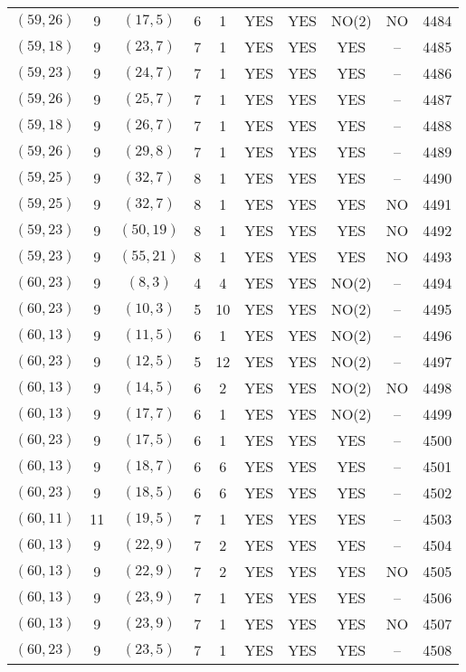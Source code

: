 \begin{longtable}{|c|c|c|c|c|c|c|c|c|c|}
$(59, 26)$ & 9 & $(17, 5)$ & 6 & 1 & YES & YES & NO(2) & NO & 4484\\
$(59, 18)$ & 9 & $(23, 7)$ & 7 & 1 & YES & YES & YES & -- & 4485\\
$(59, 23)$ & 9 & $(24, 7)$ & 7 & 1 & YES & YES & YES & -- & 4486\\
$(59, 26)$ & 9 & $(25, 7)$ & 7 & 1 & YES & YES & YES & -- & 4487\\
$(59, 18)$ & 9 & $(26, 7)$ & 7 & 1 & YES & YES & YES & -- & 4488\\
$(59, 26)$ & 9 & $(29, 8)$ & 7 & 1 & YES & YES & YES & -- & 4489\\
$(59, 25)$ & 9 & $(32, 7)$ & 8 & 1 & YES & YES & YES & -- & 4490\\
$(59, 25)$ & 9 & $(32, 7)$ & 8 & 1 & YES & YES & YES & NO & 4491\\
$(59, 23)$ & 9 & $(50, 19)$ & 8 & 1 & YES & YES & YES & NO & 4492\\
$(59, 23)$ & 9 & $(55, 21)$ & 8 & 1 & YES & YES & YES & NO & 4493\\
$(60, 23)$ & 9 & $(8, 3)$ & 4 & 4 & YES & YES & NO(2) & -- & 4494\\
$(60, 23)$ & 9 & $(10, 3)$ & 5 & 10 & YES & YES & NO(2) & -- & 4495\\
$(60, 13)$ & 9 & $(11, 5)$ & 6 & 1 & YES & YES & NO(2) & -- & 4496\\
$(60, 23)$ & 9 & $(12, 5)$ & 5 & 12 & YES & YES & NO(2) & -- & 4497\\
$(60, 13)$ & 9 & $(14, 5)$ & 6 & 2 & YES & YES & NO(2) & NO & 4498\\
$(60, 13)$ & 9 & $(17, 7)$ & 6 & 1 & YES & YES & NO(2) & -- & 4499\\
$(60, 23)$ & 9 & $(17, 5)$ & 6 & 1 & YES & YES & YES & -- & 4500\\
$(60, 13)$ & 9 & $(18, 7)$ & 6 & 6 & YES & YES & YES & -- & 4501\\
$(60, 23)$ & 9 & $(18, 5)$ & 6 & 6 & YES & YES & YES & -- & 4502\\
$(60, 11)$ & 11 & $(19, 5)$ & 7 & 1 & YES & YES & YES & -- & 4503\\
$(60, 13)$ & 9 & $(22, 9)$ & 7 & 2 & YES & YES & YES & -- & 4504\\
$(60, 13)$ & 9 & $(22, 9)$ & 7 & 2 & YES & YES & YES & NO & 4505\\
$(60, 13)$ & 9 & $(23, 9)$ & 7 & 1 & YES & YES & YES & -- & 4506\\
$(60, 13)$ & 9 & $(23, 9)$ & 7 & 1 & YES & YES & YES & NO & 4507\\
$(60, 23)$ & 9 & $(23, 5)$ & 7 & 1 & YES & YES & YES & -- & 4508\\

\end{longtable}
